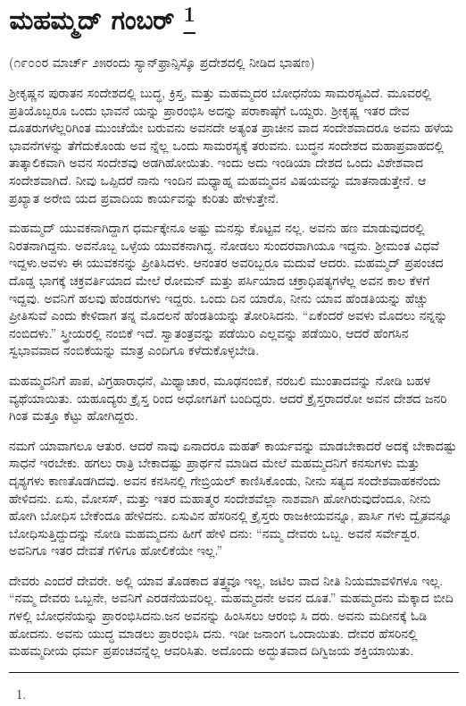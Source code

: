 
\chapter[ಮಹಮ್ಮದ್ ಗಂಬರ್ ]{ಮಹಮ್ಮದ್ ಗಂಬರ್ \protect\footnote{}}

\centerline{(೧೯೦೦ರ ಮಾರ್ಚ್​ ೨೫ರಂದು ಸ್ಯಾನ್​ಫ್ರಾನ್ಸಿಸ್ಕೊ ಪ್ರದೇಶದಲ್ಲಿ ನೀಡಿದ ಭಾಷಣ)}

ಶ‍್ರೀಕೃಷ್ಣನ ಪುರಾತನ ಸಂದೇಶದಲ್ಲಿ ಬುದ್ಧ, ಕ್ರಿಸ್ತ, ಮತ್ತು ಮಹಮ್ಮದರ ಬೋಧನೆಯ ಸಾಮರಸ್ಯವಿದೆ. ಮೂವರಲ್ಲಿ ಪ್ರತಿಯೊಬ್ಬರೂ ಒಂದು ಭಾವನೆ ಯನ್ನು ಪ್ರಾರಂಭಿಸಿ ಅದನ್ನು ಪರಾಕಾಷ್ಠೆಗೆ ಒಯ್ದರು. ಶ‍್ರೀಕೃಷ್ಣ ಇತರ ದೇವ ದೂತರುಗಳೆಲ್ಲರಿಗಿಂತ ಮುಂಚೆಯೇ ಬರುವನು ಅವನದೇ ಅತ್ಯಂತ ಪ್ರಾಚೀನ ವಾದ ಸಂದೇಶವಾದರೂ ಅವನು ಹಳೆಯ ಭಾವನೆಗಳನ್ನು ತೆಗೆದುಕೊಂಡು ಅವ ನ್ನೆಲ್ಲ ಒಂದು ಸಾಮರಸ್ಯಕ್ಕೆ ತರುವನು. ಬುದ್ಧನ ಸಂದೇಶದ ಮಹಾಪ್ರವಾಹದಲ್ಲಿ ತಾತ್ಕಾಲಿಕವಾಗಿ ಅವನ ಸಂದೇಶವು ಅಡಗಿಹೋಯಿತು. ಇಂದು ಅದು ಇಂಡಿಯಾ ದೇಶದ ಒಂದು ವಿಶೇಶವಾದ ಸಂದೇಶವಾಗಿದೆ. ನೀವು ಒಪ್ಪಿದರೆ ನಾನು ಇಂದಿನ ಮಧ್ಯಾಹ್ನ ಮಹಮ್ಮದನ ವಿಷಯವನ್ನು ಮಾತನಾಡುತ್ತೇನೆ. ಆ ಪ್ರಖ್ಯಾತ ಅರೇಬಿ ಯದ ಪ್ರವಾದಿಯ ಕಾರ್ಯವನ್ನು ಕುರಿತು ಹೇಳುತ್ತೇನೆ.

ಮಹಮ್ಮದ್​ ಯುವಕನಾಗಿದ್ದಾಗ ಧರ್ಮಕ್ಕೇನೂ ಅಷ್ಟು ಮನಸ್ಸು ಕೊಟ್ಟವ ನಲ್ಲ. ಅವನು ಹಣ ಮಾಡುವುದರಲ್ಲಿ ನಿರತನಾಗಿದ್ದನು. ಅವನೊಬ್ಬ ಒಳ್ಳೆಯ ಯುವಕನಾಗಿದ್ದ. ನೋಡಲು ಸುಂದರವಾಗಿಯೂ ಇದ್ದನು. ಶ‍್ರೀಮಂತ ವಿಧವೆ ಇದ್ದಳು.ಅವಳು ಈ ಯುವಕನನ್ನು ಪ್ರೀತಿಸಿದಳು. ಆನಂತರ ಅವರಿಬ್ಬರೂ ಮದುವೆ ಆದರು. ಮಹಮ್ಮದ್​ ಪ್ರಪಂಚದ ದೊಡ್ಡ ಭಾಗಕ್ಕೆ ಚಕ್ರವರ್ತಿಯಾದ ಮೇಲೆ ರೋಮನ್​ ಮತ್ತು ಪರ್ಸಿಯಾದ ಚಕ್ರಾಧಿಪತ್ಯಗಳೆಲ್ಲ ಅವನ ಕಾಲ ಕೆಳಗೆ ಇದ್ದವು. ಅವನಿಗೆ ಹಲವು ಹೆಂಡರುಗಳು ಇದ್ದರು. ಒಂದು ದಿನ ಯಾರೊ, ನೀನು ಯಾವ ಹೆಂಡತಿಯನ್ನು ಹೆಚ್ಚು ಪ್ರೀತಿಸುವೆ ಎಂದು ಕೇಳಿದಾಗ ತನ್ನ ಮೊದಲನೆ ಹೆಂಡತಿಯನ್ನು ತೋರಿಸಿದನು. “ಏಕೆಂದರೆ ಅವಳು ಮೊದಲು ನನ್ನನ್ನು ನಂಬಿದಳು.” ಸ್ತ್ರೀಯರಲ್ಲಿ ನಂಬಿಕೆ ಇದೆ. ಸ್ವಾತಂತ್ರವನ್ನು ಪಡೆಯಿರಿ ಎಲ್ಲವನ್ನು ಪಡೆಯಿರಿ, ಆದರೆ ಹೆಂಗಸಿನ ಸ್ವಭಾವವಾದ ನಂಬಿಕೆಯನ್ನು ಮಾತ್ರ ಎಂದಿಗೂ ಕಳೆದುಕೊಳ್ಳಬೇಡಿ.

ಮಹಮ್ಮದನಿಗೆ ಪಾಪ, ವಿಗ್ರಹಾರಾಧನೆ, ಮಿಥ್ಯಾಚಾರ, ಮೂಢನಂಬಿಕೆ, ನರಬಲಿ ಮುಂತಾದವನ್ನು ನೋಡಿ ಬಹಳ ವ್ಯಥೆಯಾಯಿತು. ಯಹೂದ್ಯರು ಕ್ರೈಸ್ತ ರಿಂದ ಅಧೋಗತಿಗೆ ಬಂದಿದ್ದರು. ಆದರೆ ಕ್ರೈಸ್ತರಾದರೋ ಅವನ ದೇಶದ ಜನರಿ ಗಿಂತ ಮತ್ತೂ ಕೆಟ್ಟು ಹೋಗಿದ್ದರು.

ನಮಗೆ ಯಾವಾಗಲೂ ಆತುರ. ಆದರೆ ನಾವು ಏನಾದರೂ ಮಹತ್​ ಕಾರ್ಯವನ್ನು ಮಾಡಬೇಕಾದರೆ ಅದಕ್ಕೆ ಬೇಕಾದಷ್ಟು ಸಾಧನೆ ಇರಬೇಕು. ಹಗಲು ರಾತ್ರಿ ಬೇಕಾದಷ್ಟು ಪ್ರಾರ್ಥನೆ ಮಾಡಿದ ಮೇಲೆ ಮಹಮ್ಮದನಿಗೆ ಕನಸುಗಳು ಮತ್ತು ದೃಶ್ಯಗಳು ಕಾಣತೊಡಗಿದವು. ಅವನ ಕನಸಿನಲ್ಲಿ ಗೇಬ್ರಿಯಲ್​ ಕಾಣಿಸಿಕೊಂಡು, ನೀನು ಸತ್ಯದ ಸಂದೇಶವಾಹಕನೆಂದು ಹೇಳಿದನು. ಏಸು, ಮೋಸಸ್​, ಮತ್ತು ಇತರ ಮಹಾತ್ಮರ ಸಂದೇಶವೆಲ್ಲಾ ನಾಶವಾಗಿ ಹೋಗಿರುವುದೆಂದೂ, ನೀನು ಹೋಗಿ ಬೋಧಿಸ ಬೇಕೆಂದೂ ಹೇಳಿದನು. ಏಸುವಿನ ಹೆಸರಿನಲ್ಲಿ ಕ್ರೈಸ್ತರು ರಾಜಕೀಯವನ್ನೂ, ಪಾರ್ಸಿ ಗಳು ದ್ವೈತವನ್ನೂ ಬೋಧಿಸುತ್ತಿದ್ದುದನ್ನು ನೋಡಿ ಮಹಮ್ಮದನು ಹೀಗೆ ಹೇಳಿ ದನು: “ನಮ್ಮ ದೇವರು ಒಬ್ಬ. ಅವನೆ ಸರ್ವೇಶ್ವರ. ಅವನಿಗೂ ಇತರ ದೇವತೆ ಗಳಿಗೂ ಹೋಲಿಕೆಯೇ ಇಲ್ಲ.”

ದೇವರು ಎಂದರೆ ದೇವರೇ. ಅಲ್ಲಿ ಯಾವ ತೊಡಕಾದ ತತ್ತ್ವವೂ ಇಲ್ಲ, ಜಟಿಲ ವಾದ ನೀತಿ ನಿಯಮಾವಳಿಗಳೂ ಇಲ್ಲ. “ನಮ್ಮ ದೇವರು ಒಬ್ಬನೇ, ಅವನಿಗೆ ಎರಡನೆಯವರಿಲ್ಲ. ಮಹಮ್ಮದನೇ ಅವನ ದೂತ.” ಮಹಮ್ಮದನು ಮೆಕ್ಕಾದ ಬೀದಿ ಗಳಲ್ಲಿ ಬೋಧನೆಯನ್ನು ಪ್ರಾರಂಭಿಸಿದನು.ಜನ ಅವನನ್ನು ಹಿಂಸಿಸಲು ಆರಂಭಿ ಸಿ ದರು. ಅವನು ಮದೀನಕ್ಕೆ ಓಡಿ ಹೋದನು. ಅವನು ಯುದ್ಧ ಮಾಡಲು ಪ್ರಾರಂಭಿಸಿ ದನು. ಇಡೀ ಜನಾಂಗ ಒಂದಾಯಿತು. ದೇವರ ಹೆಸರಿನಲ್ಲಿ ಮಹಮ್ಮದೀಯ ಧರ್ಮ ಪ್ರಪಂಚವನ್ನೆಲ್ಲ ಆವರಿಸಿತು. ಅದೊಂದು ಅದ್ಭುತವಾದ ದಿಗ್ವಿಜಯ ಶಕ್ತಿಯಾಯಿತು.


